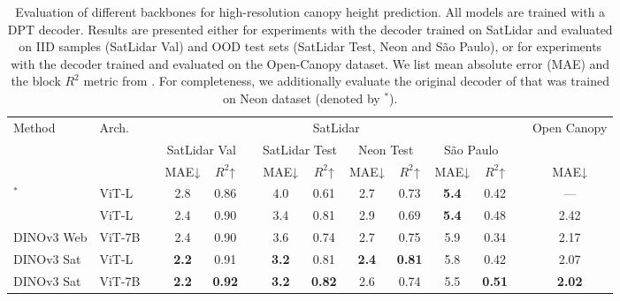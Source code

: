 \begin{table}[t]
  \centering
  \small
  \caption{Evaluation of different backbones for high-resolution canopy height prediction. All models are trained with a DPT decoder. Results are presented either for experiments with the decoder trained on SatLidar and evaluated on IID samples (SatLidar Val) and OOD test sets (SatLidar Test, Neon and S\~{a}o Paulo), or for experiments with the decoder trained and evaluated on the Open-Canopy dataset.
  We list mean absolute error (MAE) and the block $R^2$ metric from \citet{tolan2024very}.
  For completeness, we additionally evaluate the original decoder of \citet{tolan2024very} that was trained on Neon dataset (denoted by $^\ast$).}
  \label{tab:canopy}
  \setlength{\tabcolsep}{4pt}
  \begin{tabular}{@{}ll c cc c cc cc cc c c@{}}
    \toprule
    \multirow{3}{*}{Method} & \multirow{3}{*}{Arch.} & & \multicolumn{9}{c}{SatLidar} & & \multirow{2}{*}{Open Canopy} \\
    \cmidrule{4-5} \cmidrule{7-12}
    & & & \multicolumn{2}{c}{SatLidar Val} 
       & & \multicolumn{2}{c}{SatLidar Test}  
          & \multicolumn{2}{c}{Neon Test}    
          & \multicolumn{2}{c}{S\~{a}o Paulo} & & \\
        \cmidrule{4-5} \cmidrule{7-8} \cmidrule{9-10} \cmidrule{11-12} \cmidrule{14-14} 
     & & & MAE↓ & $R^2$↑ & & MAE↓   & $R^2$↑ & MAE↓   & $R^2$↑ & MAE↓   & $R^2$↑ & & MAE↓ \\
    \midrule
    \citet{tolan2024very}$^\ast$  & ViT-L 
       & & 2.8    & 0.86   
       & & 4.0    & 0.61   
         & 2.7    & 0.73   
         & \textbf{5.4}    & 0.42   
         & & ---  \\
    \citet{tolan2024very}  & ViT-L 
       & & 2.4    & 0.90   
       & & 3.4    & 0.81   
         & 2.9    & 0.69   
         & \textbf{5.4} & 0.48  
         & & 2.42 \\
    DINOv3 Web  & ViT-7B 
       & & 2.4    & 0.90   
       & & 3.6    & 0.74   
         & 2.7    & 0.75
         & 5.9    & 0.34   
         & & 2.17  \\
    DINOv3 Sat  & ViT-L
       & & \textbf{2.2} & 0.91 
       & & \textbf{3.2} & 0.81 
         & \textbf{2.4} & \textbf{0.81}  
         & 5.8    & 0.42 
         & & 2.07 \\
    DINOv3 Sat  & ViT-7B 
       & & \textbf{2.2} & \textbf{0.92} 
       & & \textbf{3.2} & \textbf{0.82} 
         & 2.6 & 0.74  
         & 5.5    & \textbf{0.51} 
         & & \textbf{2.02} \\
    \bottomrule
  \end{tabular} %
\end{table}

